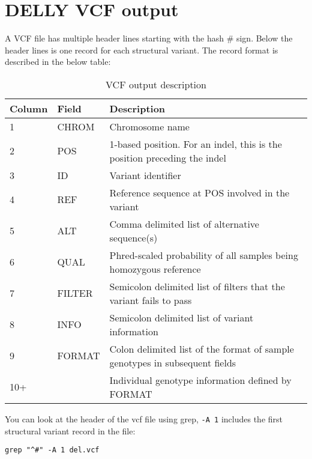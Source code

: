 \section{DELLY VCF output}

\begin{information}
A VCF file has multiple header lines starting with the hash \# sign. Below the header lines is one record for each structural variant. The record format is described in the below table:


\begin{table}[H]
  \centering
  \caption{VCF output description}
    \begin{tabular}{lll}
    \toprule
    Column & Field & Description \\
    \midrule
    1 & CHROM & Chromosome name \\
    2 & POS & 1-based position. For an indel, this is the position preceding the indel \\
    3 & ID & Variant identifier \\
    4 & REF & Reference sequence at POS involved in the variant \\
    5 & ALT & Comma delimited list of alternative sequence(s) \\
    6 & QUAL & Phred-scaled probability of all samples being homozygous reference \\
    7 & FILTER & Semicolon delimited list of filters that the variant fails to pass \\
    8 & INFO & Semicolon delimited list of variant information \\
    9 & FORMAT & Colon delimited list of the format of sample genotypes in subsequent fields \\
    10+ & & Individual genotype information defined by FORMAT \\
    \bottomrule
    \end{tabular}
  \label{tab:vcfoutput}
\end{table}


\end{information}
\begin{steps}
You can look at the header of the vcf file using grep, \texttt{-A 1} includes the first structural variant record in the file:

\begin{lstlisting}
grep "^#" -A 1 del.vcf
\end{lstlisting}
\end{steps}

